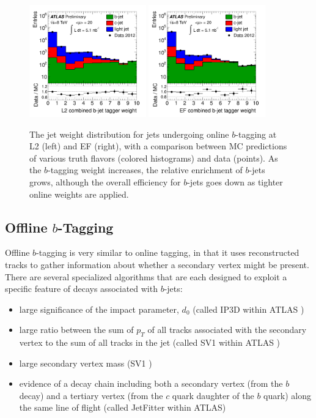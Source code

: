 \begin{figure}
	\includegraphics[width=0.45\textwidth]{ReconstructionPerformance/online_btag_L2.pdf}
	\includegraphics[width=0.45\textwidth]{ReconstructionPerformance/online_btag_EF.pdf}
	\caption{The jet weight distribution for jets undergoing online $b$-tagging at L2 (left) and EF (right),
        with a comparison between MC predictions of various truth flavors (colored histograms) and data (points).
        As the $b$-tagging weight increases, the relative enrichment of $b$-jets grows, although the overall
        efficiency for $b$-jets goes down as tighter online weights are applied. \cite{online_btag}	\label{fig:online_btag}  }
\end{figure}




\subsection{Offline $b$-Tagging}
Offline $b$-tagging is very similar to online tagging, in that it uses reconstructed tracks to gather
information about whether a secondary vertex might be present.  There are several specialized algorithms
that are each designed to exploit a specific feature of decays associated with $b$-jets:

\begin{itemize}
	\item large significance of the impact parameter, $d_0$ (called IP3D within ATLAS \cite{ip3d})
	\item large ratio between the sum of $p_T$ of all tracks associated with the secondary vertex to the sum of all tracks in the jet (called SV1 within ATLAS \cite{ip3d})
	\item large secondary vertex mass (SV1 \cite{ip3d})
	\item evidence of a decay chain including both a secondary vertex (from the $b$ decay) and a tertiary vertex (from the $c$ quark daughter of the $b$ quark) along the same line of flight (called JetFitter within ATLAS\cite{jet_fitter}) 
\end{itemize}

